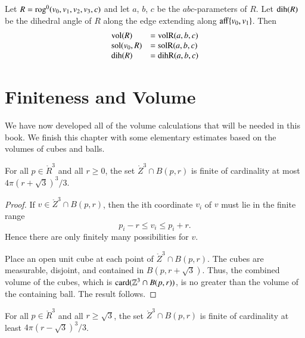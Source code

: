 \begin{lemma}\label{lemma:rog:abc} 
Let $R={\operatorname{rog}}^0(v_0,v_1,v_2,v_3,c)$ and let $a$, $b$,
$c$ be the $abc$-parameters of $R$.  Let ${\operatorname{dih}}(R)$ be the dihedral
angle of $R$ along the edge extending along ${\operatorname{aff}}\{v_0,v_1\}$.  Then
$$
\begin{array}{lll}
{\operatorname{vol}}(R) &= {\operatorname{volR}}(a,b,c)\\
{\operatorname{sol}}(v_0,R) &= {\operatorname{solR}}(a,b,c)\\
{\operatorname{dih}}(R) &= {\operatorname{dihR}}(a,b,c)\\
\end{array}
$$
\end{lemma}

\section{Finiteness and Volume}

We have now developed all of the volume calculations that will
be needed in this book.   We finish this chapter with some 
elementary estimates based on the volumes of  cubes and balls.

\begin{lemma}
    For all $p\in\ring{R}^3$ and all $r\ge 0$, the set
    $\ring{Z}^3\cap B(p,r)$ is finite of cardinality at most
    $4\pi (r+\sqrt3)^3/3$.
\end{lemma}

\begin{proof}  If $v\in\ring{Z}^3\cap B(p,r)$, then the ith
coordinate $v_i$ of $v$ must lie in the finite range
    $$
    p_i - r \le v_i \le p_i + r.
    $$
Hence there are only finitely many possibilities for $v$.


Place an open unit cube at each point of $\ring{Z}^3\cap B(p,r)$.
The cubes are measurable, disjoint, and contained in
$B(p,r+\sqrt3)$.  Thus, the combined volume of the cubes, which is
${\operatorname{card}}(\mathbb{Z}^3\cap B(p,r))$,  is no greater than the volume of the
containing ball.  The result follows.
\end{proof}

\begin{lemma}
  For all $p\in\ring{R}^3$ and all $r\ge\sqrt3$, the set
    $\ring{Z}^3\cap B(p,r)$ is finite of cardinality at least
    $4\pi (r-\sqrt3)^3/3$.
\end{lemma}

